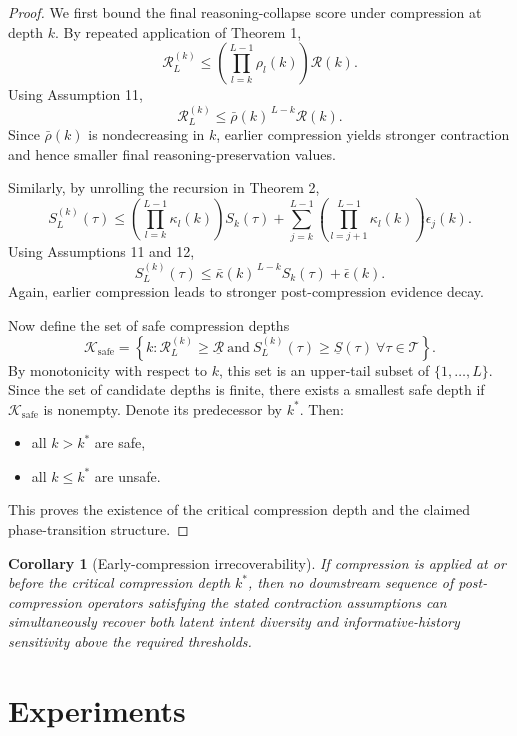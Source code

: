 \documentclass[11pt]{article}
\newtheorem{corollary}{Corollary}
\newcommand{\T}{\mathcal{T}}
\begin{document}
\begin{proof}
We first bound the final reasoning-collapse score under compression at depth $k$. By repeated application of Theorem 1,
\[
\mathcal{R}^{(k)}_L
\le
\left(
\prod_{l=k}^{L-1}\rho_l(k)
\right)\mathcal{R}(k).
\]
Using Assumption 11,
\[
\mathcal{R}^{(k)}_L
\le
\bar{\rho}(k)^{\,L-k}\mathcal{R}(k).
\]
Since $\bar{\rho}(k)$ is nondecreasing in $k$, earlier compression yields stronger contraction and hence smaller final reasoning-preservation values.

Similarly, by unrolling the recursion in Theorem 2,
\[
S^{(k)}_L(\tau)
\le
\left(
\prod_{l=k}^{L-1}\kappa_l(k)
\right)S_k(\tau)
+
\sum_{j=k}^{L-1}
\left(
\prod_{l=j+1}^{L-1}\kappa_l(k)
\right)\epsilon_j(k).
\]
Using Assumptions 11 and 12,
\[
S^{(k)}_L(\tau)
\le
\bar{\kappa}(k)^{\,L-k} S_k(\tau) + \bar{\epsilon}(k).
\]
Again, earlier compression leads to stronger post-compression evidence decay.

Now define the set of safe compression depths
\[
\mathcal{K}_{\mathrm{safe}}
=
\left\{
k :
\mathcal{R}^{(k)}_L \ge \underline{\mathcal{R}}
\ \text{and}\
S^{(k)}_L(\tau)\ge \underline{S}(\tau)
\ \forall \tau \in \T
\right\}.
\]
By monotonicity with respect to $k$, this set is an upper-tail subset of $\{1,\dots,L\}$. Since the set of candidate depths is finite, there exists a smallest safe depth if $\mathcal{K}_{\mathrm{safe}}$ is nonempty. Denote its predecessor by $k^*$. Then:
\begin{itemize}
    \item all $k>k^*$ are safe,
    \item all $k\le k^*$ are unsafe.
\end{itemize}
This proves the existence of the critical compression depth and the claimed phase-transition structure.
\end{proof}

\begin{corollary}[Early-compression irrecoverability]
If compression is applied at or before the critical compression depth $k^*$, then no downstream sequence of post-compression operators satisfying the stated contraction assumptions can simultaneously recover both latent intent diversity and informative-history sensitivity above the required thresholds.
\end{corollary}

\section{Experiments}
\end{document}
